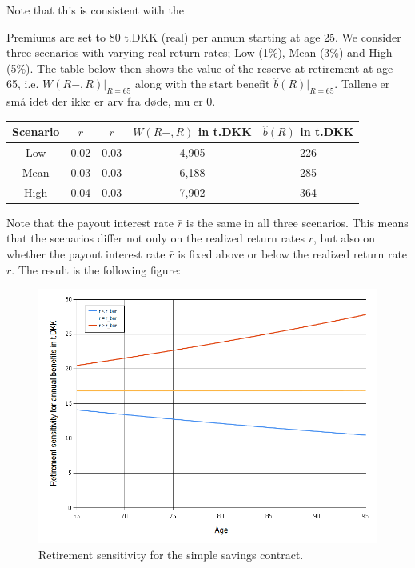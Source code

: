 \documentclass{book}
\newcommand{\1}[1]{\mathbbm{1}_{\left\lbrace #1 \right\rbrace}}
\theoremstyle{break}
\theoremstyle{remark}
\numberwithin{equation}{section}
\begin{document}
Note that this is consistent with the 

\begin{example}
Premiums are set to 80 t.DKK (real) per annum starting at age 25. We consider three scenarios with varying real return rates; Low (1\%), Mean (3\%) and High (5\%). The table below then shows the value of the reserve at retirement at age 65, i.e. $W(R-,R)|_{R=65}$ along with the start benefit $\hat{b}(R)|_{R=65}$. Tallene er små idet der ikke er arv fra døde, mu er 0.

\begin{center}
	\begin{tabular}{ |c|c|c|c|c| }
		\hline
		Scenario & $r$ & $\bar{r}$ & $W(R-,R)$ in t.DKK & $\hat{b}(R)$ in t.DKK \\
		\hline
		Low & 0.02 & 0.03 & 4,905 & 226 \\
		Mean & 0.03 & 0.03 & 6,188 & 285 \\
		High & 0.04 & 0.03 & 7,902 & 364 \\
		\hline
	\end{tabular}
\end{center}

Note that the payout interest rate $\bar{r}$ is the same in all three scenarios. This means that the scenarios differ not only on the realized return rates $r$, but also on whether the payout interest rate $\bar{r}$ is fixed above or below the realized return rate $r$. The result is the following figure:

\begin{figure}[H] \label{RSensiGraph}
	\centering
	\caption{Retirement sensitivity for the simple savings contract.}
	\includegraphics[width=\textwidth]{Rsensi}		
\end{figure}


\end{example}
\end{document}
